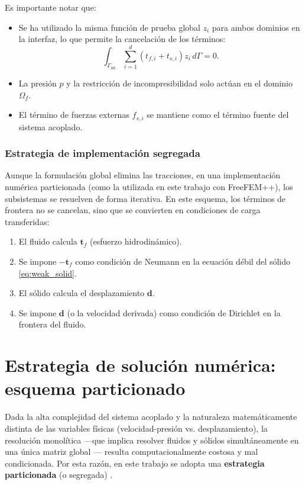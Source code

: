 \documentclass[12pt, letterpaper]{report}
\theoremstyle{definition}
\begin{document}
Es importante notar que:
\begin{itemize}
    \item Se ha utilizado la misma función de prueba global $z_i$ para ambos dominios en la interfaz, lo que permite la cancelación de los términos:
    \[ \int_{\Gamma_{\text{int}}} \sum_{i=1}^d (t_{f,i} + t_{s,i}) z_i \, d\Gamma = 0. \]
    \item La presión $p$ y la restricción de incompresibilidad solo actúan en el dominio $\Omega_f$.
    \item El término de fuerzas externas $f_{s,i}$ se mantiene como el término fuente del sistema acoplado.
\end{itemize}

\subsubsection*{Estrategia de implementación segregada}
Aunque la formulación global elimina las tracciones, en una implementación numérica particionada (como la utilizada en este trabajo con FreeFEM++), los subsistemas se resuelven de forma iterativa. En este esquema, los términos de frontera no se cancelan, sino que se convierten en condiciones de carga transferidas:
\begin{enumerate}
    \item El fluido calcula $\mathbf{t}_f$ (esfuerzo hidrodinámico).
    \item Se impone $-\mathbf{t}_f$ como condición de Neumann en la ecuación débil del sólido \eqref{eq:weak_solid}.
    \item El sólido calcula el desplazamiento $\mathbf{d}$.
    \item Se impone $\mathbf{d}$ (o la velocidad derivada) como condición de Dirichlet en la frontera del fluido.
\end{enumerate}

\section{Estrategia de solución numérica: esquema particionado}
\label{sec:esquema_particionado}

Dada la alta complejidad del sistema acoplado y la naturaleza matemáticamente distinta de las variables físicas (velocidad-presión vs. desplazamiento), la resolución monolítica —que implica resolver fluidos y sólidos simultáneamente en una única matriz global \cite{hron2006monolithic}— resulta computacionalmente costosa y mal condicionada. Por esta razón, en este trabajo se adopta una \textbf{estrategia particionada} (o segregada) \cite{felippa2001partitioned, delaisse2023quasinewton}.
\end{document}
